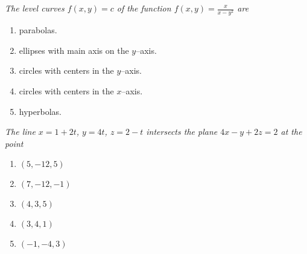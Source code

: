 \documentclass[12pt]{article}
\begin{document}
{\problem[10 pts] \em The level curves $f(x,y)=c$ of the function
  $f(x,y) = \displaystyle{ \frac{x}{x-y^2} }$ are}
\begin{enumerate}
\item parabolas.
\item ellipses with main axis on the $y$--axis.
\item circles with centers in the $y$--axis.
\item circles with centers in the $x$--axis.
\item hyperbolas.
\end{enumerate}
\vspace{2cm}

{\problem[10 pts] \em The line $x=1+2t$, $y=4t$, $z=2-t$ intersects
  the plane $4x-y+2z=2$ at the point}
\begin{enumerate}
\item $(5,-12,5)$
\item $(7,-12,-1)$
\item $(4,3,5)$
\item $(3,4,1)$
\item $(-1,-4,3)$
\end{enumerate}
\end{document}

